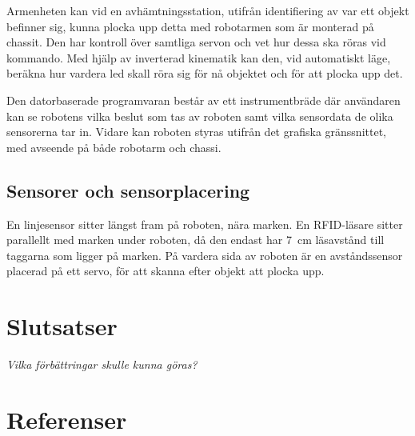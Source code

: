 \documentclass[a4paper,12pt]{article}
\begin{document}
Armenheten kan vid en avhämtningsstation, utifrån identifiering av var ett objekt befinner sig, kunna plocka upp detta med robotarmen som är monterad på chassit. Den har kontroll över samtliga servon och vet hur dessa ska röras vid kommando. Med hjälp av inverterad kinematik kan den, vid automatiskt läge, beräkna hur vardera led skall röra sig för nå objektet och för att plocka upp det.

Den datorbaserade programvaran består av ett instrumentbräde där användaren kan se robotens vilka beslut som tas av roboten samt vilka sensordata de olika sensorerna tar in. Vidare kan roboten styras utifrån det grafiska gränssnittet, med avseende på både robotarm och chassi.

\subsection{Sensorer och sensorplacering}

En linjesensor sitter längst fram på roboten, nära marken. En RFID-läsare sitter parallellt med marken under roboten, då den endast har 7~cm läsavstånd till taggarna som ligger på marken. På vardera sida av roboten är en avståndssensor placerad på ett servo, för att skanna efter objekt att plocka upp.









\section{Slutsatser}
\emph{Vilka förbättringar skulle kunna göras?}

\newpage
\section*{Referenser}


\newpage
\appendix

\end{document}

